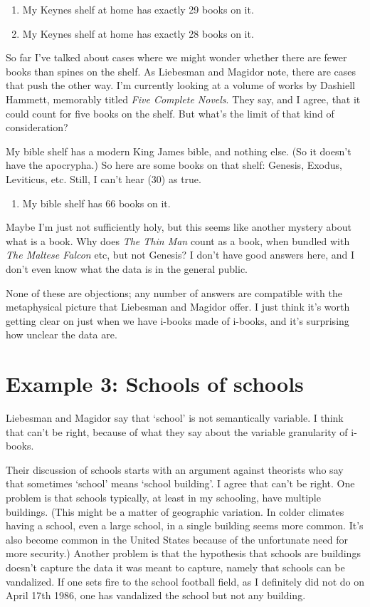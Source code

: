 \documentclass[
  11pt,
  letterpaper,
  DIV=11,
  numbers=noendperiod,
  twoside]{scrartcl}
\providecommand{\tightlist}{%
  \setlength{\itemsep}{0pt}\setlength{\parskip}{0pt}}
\begin{document}
\begin{enumerate}
\def\labelenumi{(\arabic{enumi})}
\setcounter{enumi}{27}
\tightlist
\item
  My Keynes shelf at home has exactly 29 books on it.
\item
  My Keynes shelf at home has exactly 28 books on it.
\end{enumerate}

So far I've talked about cases where we might wonder whether there are
fewer books than spines on the shelf. As Liebesman and Magidor note,
there are cases that push the other way. I'm currently looking at a
volume of works by Dashiell Hammett, memorably titled \emph{Five
Complete Novels}. They say, and I agree, that it could count for five
books on the shelf. But what's the limit of that kind of consideration?

My bible shelf has a modern King James bible, and nothing else. (So it
doesn't have the apocrypha.) So here are some books on that shelf:
Genesis, Exodus, Leviticus, etc. Still, I can't hear (30) as true.

\begin{enumerate}
\def\labelenumi{(\arabic{enumi})}
\setcounter{enumi}{29}
\tightlist
\item
  My bible shelf has 66 books on it.
\end{enumerate}

Maybe I'm just not sufficiently holy, but this seems like another
mystery about what is a book. Why does \emph{The Thin Man} count as a
book, when bundled with \emph{The Maltese Falcon} etc, but not Genesis?
I don't have good answers here, and I don't even know what the data is
in the general public.

None of these are objections; any number of answers are compatible with
the metaphysical picture that Liebesman and Magidor offer. I just think
it's worth getting clear on just when we have i-books made of i-books,
and it's surprising how unclear the data are.

\section{Example 3: Schools of
schools}\label{example-3-schools-of-schools}

Liebesman and Magidor say that `school' is not semantically variable. I
think that can't be right, because of what they say about the variable
granularity of i-books.

Their discussion of schools starts with an argument against theorists
who say that sometimes `school' means `school building'. I agree that
can't be right. One problem is that schools typically, at least in my
schooling, have multiple buildings. (This might be a matter of
geographic variation. In colder climates having a school, even a large
school, in a single building seems more common. It's also become common
in the United States because of the unfortunate need for more security.)
Another problem is that the hypothesis that schools are buildings
doesn't capture the data it was meant to capture, namely that schools
can be vandalized. If one sets fire to the school football field, as I
definitely did not do on April 17th 1986, one has vandalized the school
but not any building.
\end{document}
